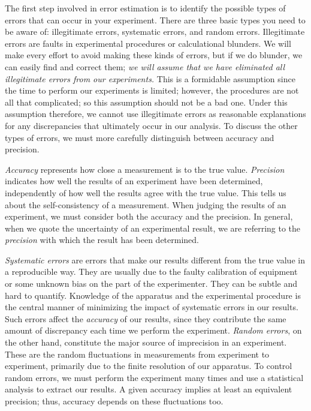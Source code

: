 The first step involved in error estimation is to identify the possible types 
of errors that can occur in your experiment. There are three basic types you 
need to be aware of: illegitimate errors, systematic errors, and random errors. 
Illegitimate errors are faults in experimental procedures or 
calculational blunders. We will make every effort to avoid making these kinds 
of errors, but if we do blunder, we can easily find and correct
them; {\em we will assume that we have eliminated all illegitimate errors 
from our experiments.} This is a formidable assumption since the time to 
perform our experiments is limited; however, the procedures are not all that 
complicated; so this assumption should not be a bad one. Under this assumption
therefore, we cannot use illegitimate errors as reasonable explanations for
any discrepancies that ultimately occur in our analysis. To discuss the other
types of errors, we must more carefully distinguish between accuracy and 
precision.

{\em Accuracy} represents how close a measurement is to the true value. 
{\em Precision} indicates how well the results of an experiment have been 
determined, independently of how well the results agree with the true value.
This tells us about the self-consistency of a measurement. When judging the 
results of an experiment, we must consider both the accuracy and the 
precision. In general, when we quote the uncertainty of an experimental 
result, we are referring to the {\em precision} with which the result has been 
determined.

{\em Systematic errors} are errors that make our results different from  the 
true value in a reproducible way. They are usually due to the faulty 
calibration of equipment or some unknown bias on the part of the experimenter. 
They can be subtle and hard to quantify. Knowledge of the apparatus and the 
experimental procedure is the central manner of minimizing the impact of 
systematic errors in our results. Such errors affect the {\em accuracy} of our 
results, since  they contribute the same amount of discrepancy each time we 
perform the experiment. {\em Random errors}, on the other hand, constitute the 
major source of imprecision in an experiment. These are the random 
fluctuations in measurements from experiment to experiment, primarily due to 
the finite resolution of our apparatus. To control random errors, we must 
perform the experiment many times and use a statistical analysis to extract 
our results. A given accuracy implies at  least an equivalent precision; thus, 
accuracy depends on these fluctuations too.


